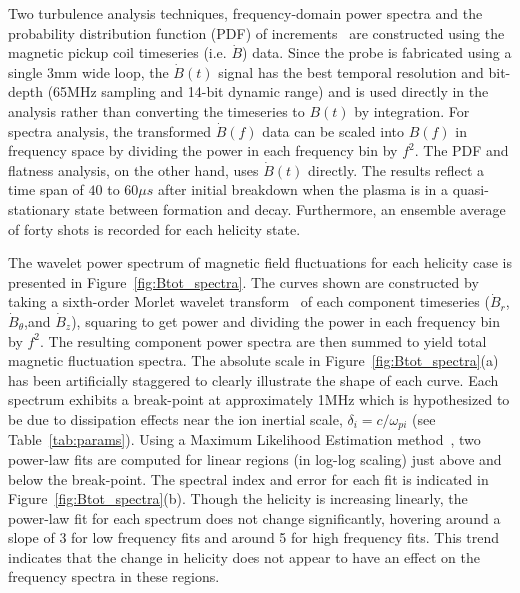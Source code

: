 \documentclass[aps,prl,amsmath,amssymb,reprint,superscriptaddress]{revtex4-1} %
\begin{document}
Two turbulence analysis techniques, frequency-domain power spectra and the probability distribution function (PDF) of increments~\cite{Greco09} are constructed using the magnetic pickup coil timeseries (i.e. $\dot{B}$) data. Since the probe is fabricated using a single 3mm wide loop, the $\dot{B}(t)$ signal has the best temporal resolution and bit-depth (65MHz sampling and 14-bit dynamic range) and is used directly in the analysis rather than converting the timeseries to $B(t)$ by integration. For spectra analysis, the transformed $\dot{B}(f)$ data can be scaled into $B(f)$ in frequency space by dividing the power in each frequency bin by $f^{2}$. The PDF and flatness analysis, on the other hand, uses $\dot{B}(t)$ directly. The results reflect a time span of $40$ to $60 \mu s$ after initial breakdown when the plasma is in a quasi-stationary state between formation and decay. Furthermore, an ensemble average of forty shots is recorded for each helicity state.

The wavelet power spectrum of magnetic field fluctuations for each helicity case is presented in Figure~\ref{fig:Btot_spectra}. The curves shown are constructed by taking a sixth-order Morlet wavelet transform~\cite{torrence98} of each component timeseries ($\dot{B}_r$,$\dot{B}_{\theta}$,and $\dot{B}_{z}$), squaring to get power and dividing the power in each frequency bin by $f^{2}$. The resulting component power spectra are then summed to yield total magnetic fluctuation spectra. The absolute scale in Figure~\ref{fig:Btot_spectra}(a) has been artificially staggered to clearly illustrate the shape of each curve. Each spectrum exhibits a break-point at approximately 1MHz which is hypothesized to be due to dissipation effects near the ion inertial scale, $\delta_{i} = c/\omega_{pi}$ (see Table~\ref{tab:params}). Using a Maximum Likelihood Estimation method~\cite{deWit13,clauset09}, two power-law fits are computed for linear regions (in log-log scaling) just above and below the break-point. The spectral index and error for each fit is indicated in Figure~\ref{fig:Btot_spectra}(b). Though the helicity is increasing linearly, the power-law fit for each spectrum does not change significantly, hovering around a slope of 3 for low frequency fits and around 5 for high frequency fits. This trend indicates that the change in helicity does not appear to have an effect on the frequency spectra in these regions.
\end{document}
